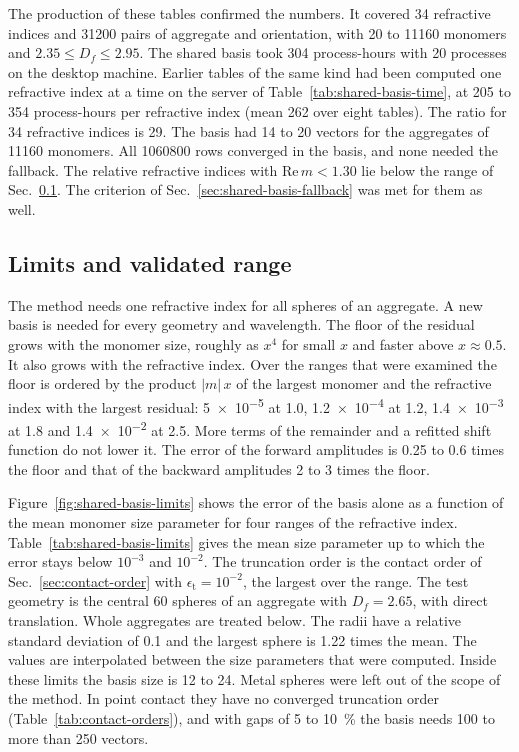 \documentclass[11pt,a4paper]{article}
\begin{document}
The production of these tables confirmed the numbers.
It covered 34 refractive indices and 31200 pairs of aggregate and orientation, with 20 to 11160 monomers and $2.35 \leq D_f \leq 2.95$.
The shared basis took 304 process-hours with 20 processes on the desktop machine.
Earlier tables of the same kind had been computed one refractive index at a time on the server of Table~\ref{tab:shared-basis-time}, at 205 to 354 process-hours per refractive index (mean 262 over eight tables).
The ratio for 34 refractive indices is 29.
The basis had 14 to 20 vectors for the aggregates of 11160 monomers.
All \num{1060800} rows converged in the basis, and none needed the fallback.
The relative refractive indices with $\mathrm{Re}\,m < 1.30$ lie below the range of Sec.~\ref{sec:shared-basis-limits}.
The criterion of Sec.~\ref{sec:shared-basis-fallback} was met for them as well.

\subsection{Limits and validated range}
\label{sec:shared-basis-limits}
The method needs one refractive index for all spheres of an aggregate.
A new basis is needed for every geometry and wavelength.
The floor of the residual grows with the monomer size, roughly as $x^4$ for small $x$ and faster above $x \approx 0.5$.
It also grows with the refractive index.
Over the ranges that were examined the floor is ordered by the product $|m|\,x$ of the largest monomer and the refractive index with the largest residual: \num{5e-5} at 1.0, \num{1.2e-4} at 1.2, \num{1.4e-3} at 1.8 and \num{1.4e-2} at 2.5.
More terms of the remainder and a refitted shift function do not lower it.
The error of the forward amplitudes is 0.25 to 0.6 times the floor and that of the backward amplitudes 2 to 3 times the floor.

Figure~\ref{fig:shared-basis-limits} shows the error of the basis alone as a function of the mean monomer size parameter for four ranges of the refractive index.
Table~\ref{tab:shared-basis-limits} gives the mean size parameter up to which the error stays below $10^{-3}$ and $10^{-2}$.
The truncation order is the contact order of Sec.~\ref{sec:contact-order} with $\epsilon_\mathrm{t} = 10^{-2}$, the largest over the range.
The test geometry is the central 60 spheres of an aggregate with $D_f = 2.65$, with direct translation.
Whole aggregates are treated below.
The radii have a relative standard deviation of 0.1 and the largest sphere is 1.22 times the mean.
The values are interpolated between the size parameters that were computed.
Inside these limits the basis size is 12 to 24.
Metal spheres were left out of the scope of the method.
In point contact they have no converged truncation order (Table~\ref{tab:contact-orders}), and with gaps of 5 to \SI{10}{\percent} the basis needs 100 to more than 250 vectors.
\end{document}
